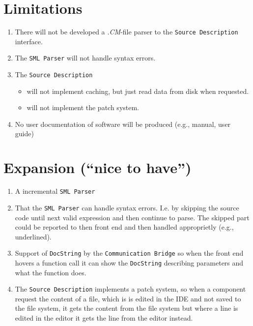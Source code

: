 \documentclass[a4paper,oneside]{memoir}
\begin{document}
\section{Limitations}

\begin{enumerate}
\item There will not be developed a \textit{.CM}-file parser to the
  \texttt{Source Description} interface.

\item The \texttt{SML Parser} will not handle syntax errors. 

\item The \texttt{Source Description} 

  \begin{itemize}
  \item will not implement caching, but just read data from disk when requested.

  \item will not implement the patch system.
  \end{itemize}

\item No user documentation of software will be produced (e.g., manual, user guide)
\end{enumerate}


\section{Expansion (``nice to have'')}


\begin{enumerate}
\item A incremental \texttt{SML Parser}

\item That the \texttt{SML Parser} can handle syntax errors. I.e. by skipping
  the source code until next valid expression and then continue to parse. The
  skipped part could be reported to then front end and then handled approprietly
  (e.g., underlined).

\item Support of \texttt{DocString} by the \texttt{Communication Bridge} so when
  the front end hovers a function call it can show the \texttt{DocString}
  describing parameters and what the function does.

\item The \texttt{Source Description} implements a patch system, so when a
  component request the content of  a file, which is is edited in the IDE and
  not saved to the file system, it gets the content from the file system but
  where a line is edited in the editor it gets the line from the editor instead.
\end{enumerate}
\end{document}
